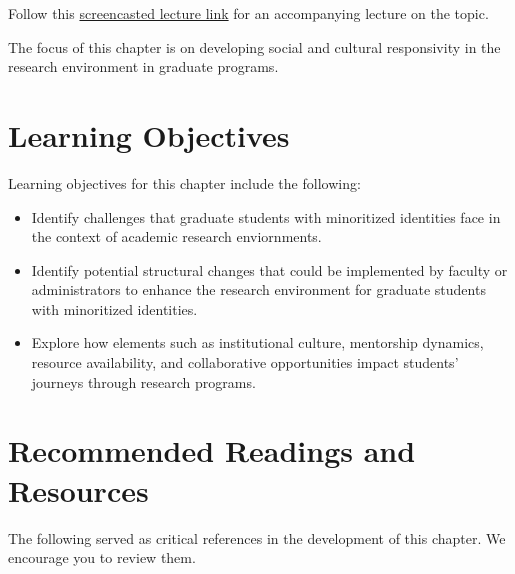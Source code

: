 \documentclass[
  11pt,
]{book}
\providecommand{\tightlist}{%
  \setlength{\itemsep}{0pt}\setlength{\parskip}{0pt}}
\begin{document}
Follow this \href{https://youtu.be/rS_Y-RMS2c8}{screencasted lecture link} for an accompanying lecture on the topic.

The focus of this chapter is on developing social and cultural responsivity in the research environment in graduate programs.

\section{Learning Objectives}\label{learning-objectives-6}

Learning objectives for this chapter include the following:

\begin{itemize}
\tightlist
\item
  Identify challenges that graduate students with minoritized identities face in the context of academic research enviornments.
\item
  Identify potential structural changes that could be implemented by faculty or administrators to enhance the research environment for graduate students with minoritized identities.
\item
  Explore how elements such as institutional culture, mentorship dynamics, resource availability, and collaborative opportunities impact students' journeys through research programs.
\end{itemize}

\section{Recommended Readings and Resources}\label{recommended-readings-and-resources-4}

The following served as critical references in the development of this chapter. We encourage you to review them.
\end{document}
